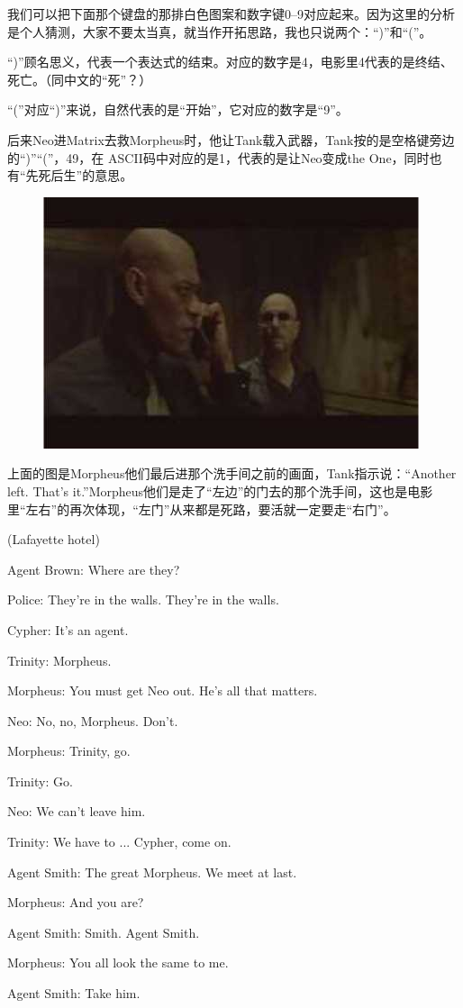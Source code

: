 \documentclass[UTF8]{ctexart}
\newenvironment{myquote}{\color{green} \setlength{\leftskip}{6em} \setlength{\rightskip}{4em} \setlength{\parindent}{-2em}}{\par}
\begin{document}
我们可以把下面那个键盘的那排白色图案和数字键0--9对应起来。因为这里的分析是个人猜测，大家不要太当真，就当作开拓思路，我也只说两个：“)”和“(”。

“)”顾名思义，代表一个表达式的结束。对应的数字是4，电影里4代表的是终结、死亡。（同中文的“死”？）

“(”对应“)”来说，自然代表的是“开始”，它对应的数字是“9”。

后来Neo进Matrix去救Morpheus时，他让Tank载入武器，Tank按的是空格键旁边的“)”“(”，49，在 ASCII码中对应的是1，代表的是让Neo变成the One，同时也有“先死后生”的意思。

\begin{figure}[htb]
\centering
\includegraphics[width=0.5\linewidth]{fig/read_Matrix-56}
\end{figure}

上面的图是Morpheus他们最后进那个洗手间之前的画面，Tank指示说：“Another left. That's it.”Morpheus他们是走了“左边”的门去的那个洗手间，这也是电影里“左右”的再次体现，“左门”从来都是死路，要活就一定要走“右门”。

\begin{myquote}
(Lafayette hotel)

Agent Brown: Where are they?

Police: They're in the walls. They're in the walls.

Cypher: It's an agent.

Trinity: Morpheus.

Morpheus: You must get Neo out. He's all that matters.

Neo: No, no, Morpheus. Don't.

Morpheus: Trinity, go.

Trinity: Go.

Neo: We can't leave him.

Trinity: We have to ... Cypher, come on.

Agent Smith: The great Morpheus. We meet at last.

Morpheus: And you are?

Agent Smith: Smith. Agent Smith.

Morpheus: You all look the same to me.

Agent Smith: Take him.
\end{myquote}
\end{document}
